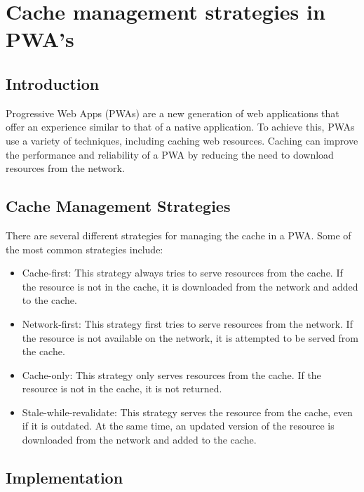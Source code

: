\documentclass{report}
\begin{document}


\tableofcontents

\chapter{Cache management strategies in PWA's}\label{Cache management strategies in PWA's}
\section{Introduction}\label{intro}
Progressive Web Apps (PWAs) are a new generation of web applications that offer an experience similar to that of a native application. To achieve this, PWAs use a variety of techniques, including caching web resources. Caching can improve the performance and reliability of a PWA by reducing the need to download resources from the network. 

\section{Cache Management Strategies}\label{Cache Management Strategies}
There are several different strategies for managing the cache in a PWA. Some of the most common strategies include:
\begin{itemize}
    \item Cache-first: This strategy always tries to serve resources from the cache. If the resource is not in the cache, it is downloaded from the network and added to the cache.
    \item Network-first: This strategy first tries to serve resources from the network. If the resource is not available on the network, it is attempted to be served from the cache.
    \item Cache-only: This strategy only serves resources from the cache. If the resource is not in the cache, it is not returned.
    \item Stale-while-revalidate: This strategy serves the resource from the cache, even if it is outdated. At the same time, an updated version of the resource is downloaded from the network and added to the cache.
\end{itemize} \cite{google23}

\section{Implementation}\label{Implementation}
\end{document}
